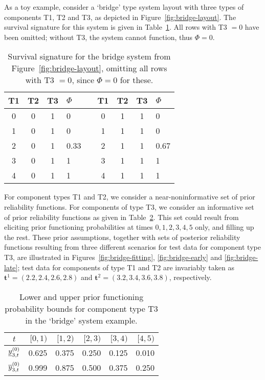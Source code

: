 \documentclass[12pt, a4paper]{elsarticle}
\newcommand{\bs}[1]{\boldsymbol{#1}}
\renewcommand{\vec}[1]{{\bs#1}}
\begin{document}
As a toy example, consider a `bridge' type system layout with three types of components T1, T2 and T3,
as depicted in Figure~\ref{fig:bridge-layout}.
The survival signature for this system is given in Table~\ref{tab:bridge-survsign}.
All rows with T3 $=0$ have been omitted; without T3, the system cannot function, thus $\Phi = 0$.
\begin{table}
\centering
\begin{tabular}{ccclccccl}
  \toprule
T1 & T2 & T3 & $\Phi$ & \quad & T1 & T2 & T3 & $\Phi$\\ 
  \midrule
0 & 0 & 1 & 0    & & 0 & 1 & 1 & 0 \\ 
1 & 0 & 1 & 0    & & 1 & 1 & 1 & 0 \\ 
2 & 0 & 1 & 0.33 & & 2 & 1 & 1 & 0.67 \\ 
3 & 0 & 1 & 1    & & 3 & 1 & 1 & 1 \\ 
4 & 0 & 1 & 1    & & 4 & 1 & 1 & 1 \\ 
   \bottomrule
\end{tabular}
\caption{Survival signature for the bridge system from Figure~\ref{fig:bridge-layout},
omitting all rows with T3 $=0$, since $\Phi=0$ for these.}
\label{tab:bridge-survsign}
\end{table}
For component types T1 and T2, we consider a near-noninformative set of prior reliability functions.
For components of type T3, we consider an informative set of prior reliability functions
as given in Table~\ref{tab:bridge-T3prior}.
This set could result from eliciting prior functioning probabilities at times $0,1,2,3,4,5$ only,
and filling up the rest.
These prior assumptions, together with sets of posterior reliability functions
resulting from three different scenarios for test data for component type T3,
are illustrated in Figures~\ref{fig:bridge-fitting}, \ref{fig:bridge-early} and \ref{fig:bridge-late}; 
test data for components of type T1 and T2 are invariably taken as
$\vec{t}^1 = (2.2, 2.4, 2.6, 2.8)$ and $\vec{t}^2 = (3.2, 3.4, 3.6, 3.8)$, respectively.

\begin{table}
\centering
\begin{tabular}{crrrrr}
\toprule
$t$ & $[0,1)$ & $[1,2)$ & $[2,3)$ & $[3,4)$ & $[4,5)$ \\
\midrule
$\underline{y}^{(0)}_{3,t}$ & 0.625 & 0.375 & 0.250 & 0.125 & 0.010 \\
$\overline{y}^{(0)}_{3,t}$ & 0.999 & 0.875 & 0.500 & 0.375 & 0.250 \\
\bottomrule
\end{tabular}
\caption{Lower and upper prior functioning probability bounds for component type T3 in the `bridge' system example.}
\label{tab:bridge-T3prior}
\end{table}
\end{document}

